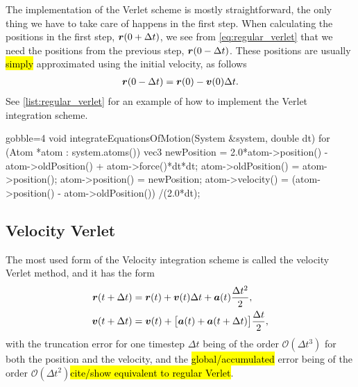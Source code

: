 The implementation of the Verlet scheme is mostly straightforward, the only thing we have to take care of happens in the first step. When calculating the positions in the first step, $\boldsymbol{r}(0+\Delta t)$, we see from \cref{eq:regular_verlet} that we need the positions from the previous step, $\boldsymbol{r}(0-\Delta t)$. These positions are usually \hl{simply} approximated using the initial velocity, as follows
\begin{align*}
    \boldsymbol{r}(0-\Delta t) = \boldsymbol{r}(0) - \boldsymbol{v}(0)\Delta t.
\end{align*}
See \cref{list:regular_verlet} for an example of how to implement the Verlet integration scheme.
%
\begin{listing}[!htb]%
\begin{cppcode*}{gobble=4}
    void integrateEquationsOfMotion(System &system, double dt)
    {
        for (Atom *atom : system.atoms())
        {
            vec3 newPosition = 2.0*atom->position() - atom->oldPosition() 
                               + atom->force()*dt*dt;
            atom->oldPosition() = atom->position();
            atom->position() = newPosition;
            atom->velocity() = (atom->position() - atom->oldPosition())
                               /(2.0*dt);
        }
    }
\end{cppcode*}
\caption{%
    Implentation of \texttt{integrateEquationsOfMotion} from \cref{list:simple_md_program}.%
    \label{list:regular_verlet}%
}%
\end{listing}%

\subsection{Velocity Verlet}
The most used form of the Velocity integration scheme is called the velocity Verlet method\cite{swope1982computer}, and it has the form
\begin{align}
    \boldsymbol{r}(t + \Delta t) &= \boldsymbol{r}(t) + \boldsymbol{v}(t)\Delta t + \boldsymbol{a}(t)\frac{\Delta t^2}{2}, \label{eq:velocity_verlet_position}\\
    \boldsymbol{v}(t + \Delta t) &= \boldsymbol{v}(t) + \big[\boldsymbol{a}(t) + \boldsymbol{a}(t + \Delta t)\big] \frac{\Delta t}{2}, \label{eq:velocity_verlet_velocity}
\end{align}
with the truncation error for one timestep $\Delta t$ being of the order $\mathcal{O}(\Delta t^3)$ for both the position and the velocity, and the \hl{global/accumulated} error being of the order $\mathcal{O}(\Delta t^2)$\hl{cite/show equivalent to regular Verlet}. 


